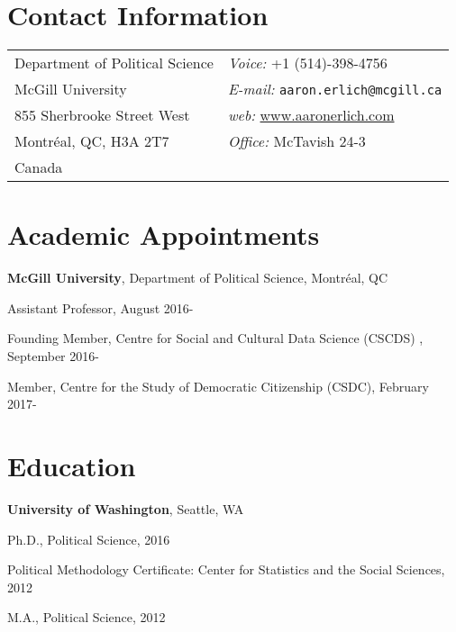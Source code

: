 \documentclass[margin,line]{res}
\newenvironment{list1}{
  \begin{list}{\ding{113}}{%
      \setlength{\itemsep}{0in}
      \setlength{\parsep}{0in} \setlength{\parskip}{0in}
      \setlength{\topsep}{0in} \setlength{\partopsep}{0in} 
      \setlength{\leftmargin}{0.17in}}}{\end{list}}
\begin{document}
{\name{\textcolor{Maroon}{\LARGE	Aaron S. Erlich} \vspace*{.1in}}

\begin{resume}
\section{\sc Contact Information}
\vspace{.05in}
\begin{tabular}{@{}p{3in}p{3in}}
Department of Political Science        &    {\it Voice:} +1 (514)-398-4756 \\            
McGill University   &    {\it E-mail:} \texttt{aaron.erlich@mcgill.ca}\\         
855 Sherbrooke Street West   &        {\it web:} \url{www.aaronerlich.com}\\
Montréal, QC, H3A 2T7  &        {\it Office:}  McTavish 24-3\\
  Canada & 
\end{tabular}

\section{\sc Academic Appointments}
{\bf McGill University}, Department of Political Science, Montréal, QC \\
\vspace*{-.1in}
\begin{list1}
\item[] Assistant Professor, {August 2016-}
\item[] Founding Member, Centre for Social and Cultural Data Science (CSCDS) , {September 2016-}
\item[] Member, Centre for the Study of Democratic Citizenship (CSDC), {February 2017-}

\end{list1}


\section{\sc Education}
{\bf University of Washington}, Seattle, WA\\
\vspace*{-.1in}
\begin{list1}
\item[] Ph.D., Political Science, 2016
\item[] Political Methodology Certificate: Center for Statistics and the Social Sciences, 2012
\item[] M.A., Political Science, 2012
\end{list1}



\end{resume}}
\end{document}
